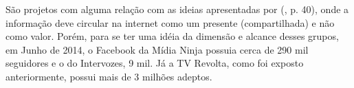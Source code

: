 \documentclass[
	article,			%
	12pt,				%
	oneside,			%
	a4paper,			%
	english,			%
	brazil,				%
	]{abntex2}
\begin{document}
São projetos com alguma relação com as ideias apresentadas por  (\citeyear{dantas2003}, p. 40), onde a informação deve circular na internet como um presente (compartilhada) e não como valor. Porém, para se ter uma idéia da dimensão e alcance desses grupos, em Junho de 2014, o Facebook da Mídia Ninja possuia cerca de 290 mil seguidores e o do Intervozes, 9 mil. Já a TV Revolta, como foi exposto anteriormente, possui mais de 3 milhões adeptos.


\end{document}
